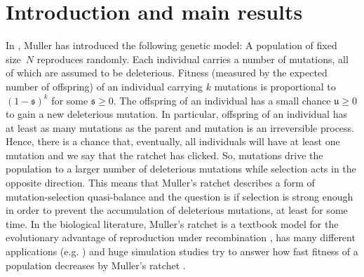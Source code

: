\documentclass{imsart}
\theoremstyle{plain}
\theoremstyle{definition}
\begin{document}
\begin{frontmatter}
\begin{keyword}[class=MSC]
\end{keyword}

\begin{keyword}
\end{keyword}

\end{frontmatter}

\section{Introduction and main results}
\label{S:intro}
In \cite{Muller1964}, Muller has introduced the following genetic model: A population of fixed size~$N$ reproduces randomly. Each individual carries a number of mutations, all of which are assumed to be deleterious. Fitness (measured by the expected number of offspring) of an individual carrying $k$ mutations is proportional to $(1 - \mathfrak s)^k$ for some $\mathfrak s\geq 0$. The offspring of an individual has a small chance $\mathfrak u \geq 0$ to gain a new deleterious mutation. In particular, offspring of an individual has at least as many mutations as the parent and mutation is an irreversible process. Hence, there is a chance that, eventually, all individuals will have at least one mutation and we say that the ratchet has clicked. So, mutations drive the population to a larger number of deleterious mutations while selection acts in the opposite direction. This means that Muller's ratchet describes a form of mutation-selection quasi-balance and the question is if selection is strong enough in order to prevent the accumulation of deleterious mutations, at least for some time. In the biological literature, Muller's ratchet is a textbook model for the evolutionary advantage of reproduction under recombination \citep{Felsenstein1974}, has many different applications  (e.g. \cite{mcfarland2013impact, howe2008muller}) and huge simulation studies try to answer how fast fitness of a population decreases by Muller's ratchet \citep{Loewe2006}. 
\end{document}

